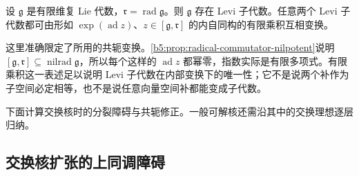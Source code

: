 \begin{theorem}\label{b5:thm:levi-malcev-preview}
	设 \(\mathfrak g\) 是有限维复 Lie 代数，\(\mathfrak r=\operatorname{rad}\mathfrak g\)。则 \(\mathfrak g\) 存在 Levi 子代数。任意两个 Levi 子代数都可由形如 \(\exp(\operatorname{ad}z)\)、\(z\in[\mathfrak g,\mathfrak r]\) 的内自同构的有限乘积互相变换。
\end{theorem}

这里准确限定了所用的共轭变换。\cref{b5:prop:radical-commutator-nilpotent}说明 \([\mathfrak g,\mathfrak r]\subseteq\operatorname{nilrad}\mathfrak g\)，所以每个这样的 \(\operatorname{ad}z\) 都幂零，指数实际是有限多项式。有限乘积这一表述足以说明 Levi 子代数在内部变换下的唯一性；它不是说两个补作为子空间必定相等，也不是说任意向量空间补都能变成子代数。

\ProseParagraphBreak

下面计算交换核时的分裂障碍与共轭修正。一般可解核还需沿其中的交换理想逐层归纳。

\subsection{交换核扩张的上同调障碍}
\label{b5:subsec:1204:03}


